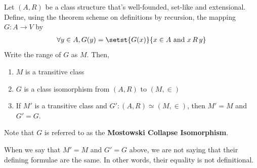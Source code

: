 \begin{boxtheorem}
    Let $(A, R)$ be a class structure that's well-founded, set-like and extensional. Define, using the theorem scheme on definitions by recursion, the mapping $G : A \to V$ by
    \begin{align*}
        \forall y \in A, G(y) = \setst{G(x)}{x \in A \text{ and } x \, R \, y}
    \end{align*}
    Write the range of $G$ as $M$. Then,
    \begin{enumerate}
        \item $M$ is a transitive class
        \item $G$ is a class isomorphism from $(A, R)$ to $(M, \in)$
        \item If $M'$ is a transitive class and $G' : (A, R) \simeq (M, \in)$, then $M' = M$ and $G' = G$.
    \end{enumerate}
    Note that $G$ is referred to as the \textbf{Mostowski Collapse Isomorphism}.
\end{boxtheorem}
\begin{remark}
    When we say that $M' = M$ and $G' = G$ above, we are not saying that their defining formulae are the same. In other words, their equality is not definitional.
\end{remark}
